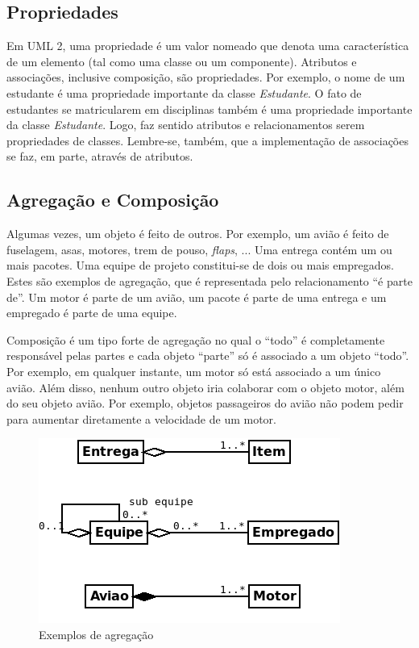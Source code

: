 \documentclass[
	11pt,				%
	openright,
	twoside,			%
	a4paper,			%
	english,			%
	french,
	brazil,				%
	sumario=tradicional
	]{abntex2}
\begin{document}
\subsection{Propriedades}

Em UML 2, uma propriedade é um valor nomeado que denota uma característica de um elemento (tal como uma classe ou um componente). Atributos e associações, inclusive composição, são propriedades. Por exemplo, o nome de um estudante é uma propriedade importante da classe \emph{Estudante}. O fato de estudantes se matricularem em disciplinas também é uma propriedade importante da classe \emph{Estudante}. Logo, faz sentido atributos e relacionamentos serem propriedades de classes. Lembre-se, também, que a implementação de associações se faz, em parte, através de atributos.

\subsection{Agregação e Composição}

Algumas vezes, um objeto é feito de outros. Por exemplo, um avião é feito de fuselagem, asas, motores, trem de pouso, \textit{flaps}, ... Uma entrega contém um ou mais pacotes. Uma equipe de projeto constitui-se de dois ou mais empregados. Estes são exemplos de agregação, que é representada pelo relacionamento ``é parte de''. Um motor é parte de um avião, um pacote é parte de uma entrega e um empregado é parte de uma equipe.

Composição é um tipo forte de agregação no qual o ``todo'' é completamente responsável pelas partes e cada objeto ``parte'' só é associado a um objeto ``todo''. Por exemplo, em qualquer instante, um motor só está associado a um único avião. Além disso, nenhum outro objeto iria colaborar com o objeto motor, além do seu objeto avião. Por exemplo, objetos passageiros do avião não podem pedir para aumentar diretamente a velocidade de um motor.

\begin{figure}[h]
\begin{center}
\includegraphics[scale=0.6]{agreg.png} 
\caption{Exemplos de agregação} \label{fig:uml8}
\end{center}\end{figure}
\end{document}
